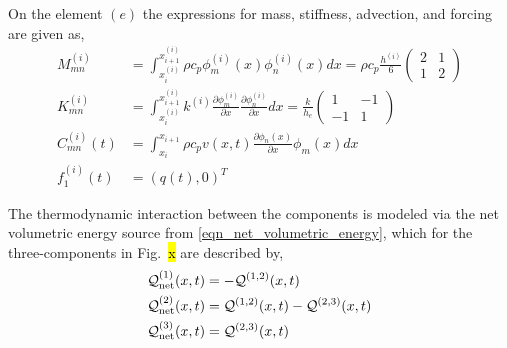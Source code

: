 On the element $(e)$ the expressions for mass, stiffness, advection, and forcing are given as,
\begin{align}
    M^{(i)}_{mn} &= \int_{x^{(i)}_i}^{x^{(i)}_{i+1}}\rho c_p\phi^{(i)}_m(x)\phi^{(i)}_n(x)dx = \rho c_p \frac{h^{(i)}}{6}\begin{pmatrix}
        2 & 1 \\ 1 & 2
    \end{pmatrix}\\
    K^{(i)}_{mn} &= \int_{x^{(i)}_i}^{x^{(i)}_{i+1}} k^{(i)} \frac{\partial \phi^{(i)}_m}{\partial x}\frac{\partial \phi^{(i)}_n}{\partial x} dx = \frac{k}{h_e}\begin{pmatrix}
        1 & -1 \\ -1 & 1
    \end{pmatrix}\\
    C^{(i)}_{mn}(t) &= \int_{x_i}^{x_{i+1}}\rho c_p v(x,t) \frac{\partial \phi_n(x)}{\partial x}\phi_m(x) dx\\
    f^{(i)}_1(t) &= \left(q(t),0\right)^T
\end{align}



The thermodynamic interaction between the components is modeled via the net volumetric energy source from \cref{eqn_net_volumetric_energy}, which for the three-components in Fig.~\hl{x} are described by,
\begin{subequations}
    \begin{align}
        \mathcal{Q}^{(1)}_{\text{net}}(x,t) &= -\mathcal{Q}^{(1,2)}(x,t)\\
        \mathcal{Q}^{(2)}_{\text{net}}(x,t) &= \mathcal{Q}^{(1,2)}(x,t) - \mathcal{Q}^{(2,3)}(x,t)\\
        \mathcal{Q}^{(3)}_{\text{net}}(x,t) &= \mathcal{Q}^{(2,3)}(x,t)
    \end{align}
\end{subequations}


